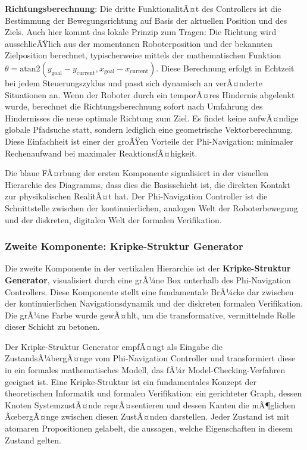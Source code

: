﻿\documentclass[a4paper,12pt]{article}
\theoremstyle{definition}
\begin{document}
\textbf{Richtungsberechnung}: Die dritte FunktionalitÃ¤t des Controllers ist die Bestimmung der Bewegungsrichtung auf Basis der aktuellen Position und des Ziels. Auch hier kommt das lokale Prinzip zum Tragen: Die Richtung wird ausschlieÃŸlich aus der momentanen Roboterposition und der bekannten Zielposition berechnet, typischerweise mittels der mathematischen Funktion $\theta = \text{atan2}(y_{\text{goal}} - y_{\text{current}}, x_{\text{goal}} - x_{\text{current}})$. Diese Berechnung erfolgt in Echtzeit bei jedem Steuerungszyklus und passt sich dynamisch an verÃ¤nderte Situationen an. Wenn der Roboter durch ein temporÃ¤res Hindernis abgelenkt wurde, berechnet die Richtungsberechnung sofort nach Umfahrung des Hindernisses die neue optimale Richtung zum Ziel. Es findet keine aufwÃ¤ndige globale Pfadsuche statt, sondern lediglich eine geometrische Vektorberechnung. Diese Einfachheit ist einer der groÃŸen Vorteile der Phi-Navigation: minimaler Rechenaufwand bei maximaler ReaktionsfÃ¤higkeit.

Die blaue FÃ¤rbung der ersten Komponente signalisiert in der visuellen Hierarchie des Diagramms, dass dies die Basisschicht ist, die direkten Kontakt zur physikalischen RealitÃ¤t hat. Der Phi-Navigation Controller ist die Schnittstelle zwischen der kontinuierlichen, analogen Welt der Roboterbewegung und der diskreten, digitalen Welt der formalen Verifikation.

\subsubsection{Zweite Komponente: Kripke-Struktur Generator}

Die zweite Komponente in der vertikalen Hierarchie ist der \textbf{Kripke-Struktur Generator}, visualisiert durch eine grÃ¼ne Box unterhalb des Phi-Navigation Controllers. Diese Komponente stellt eine fundamentale BrÃ¼cke dar zwischen der kontinuierlichen Navigationsdynamik und der diskreten formalen Verifikation. Die grÃ¼ne Farbe wurde gewÃ¤hlt, um die transformative, vermittelnde Rolle dieser Schicht zu betonen.

Der Kripke-Struktur Generator empfÃ¤ngt als Eingabe die ZustandsÃ¼bergÃ¤nge vom Phi-Navigation Controller und transformiert diese in ein formales mathematisches Modell, das fÃ¼r Model-Checking-Verfahren geeignet ist. Eine Kripke-Struktur ist ein fundamentales Konzept der theoretischen Informatik und formalen Verifikation: ein gerichteter Graph, dessen Knoten SystemzustÃ¤nde reprÃ¤sentieren und dessen Kanten die mÃ¶glichen ÃœbergÃ¤nge zwischen diesen ZustÃ¤nden darstellen. Jeder Zustand ist mit atomaren Propositionen gelabelt, die aussagen, welche Eigenschaften in diesem Zustand gelten.
\end{document}
